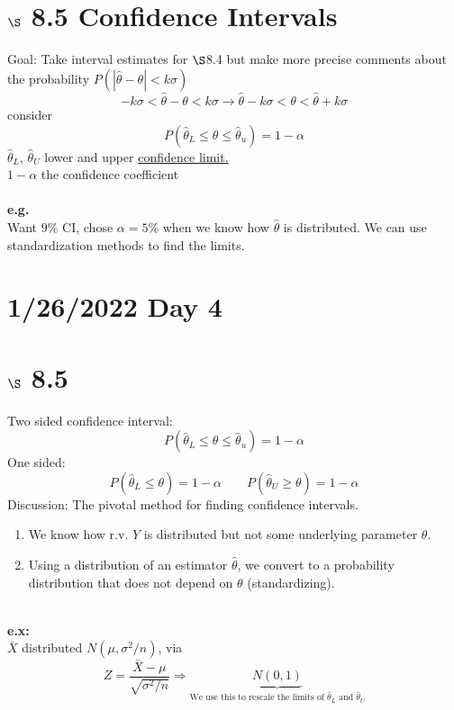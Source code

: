 \documentclass[12pt]{article}
\newcommand{\pars}[1]{\left( {#1} \right) }
\newcommand{\xbar}{\bar{X}}
\begin{document}
\section*{$\S$ 8.5 Confidence Intervals}
Goal: Take interval estimates for $\S$8.4 but make more precise comments about the probability $P\pars{\left| \hat{\theta} - \theta \right| < k\sigma}$
$$-k\sigma < \hat{\theta}-\theta < k\sigma \longrightarrow \hat{\theta} - k \sigma < \theta < \hat{\theta} + k\sigma$$
consider
$$P\pars{\hat{\theta}_L \leq \theta \leq \hat{\theta}_u} = 1 - \alpha$$
$\hat{\theta}_L$, $\hat{\theta}_U$ lower and upper \underline{confidence limit.}
\\$1-\alpha$ the confidence coefficient\\\\
\textbf{e.g.}\\

Want $9\%$ CI, chose $\alpha = 5\%$ when we know how $\hat{\theta}$ is distributed. We can use standardization methods to find the limits.
\newpage
\section*{1/26/2022 Day 4}
\section*{$\S$ 8.5}
Two sided confidence interval:
$$P\pars{\hat{\theta}_L \leq \theta \leq \hat{\theta}_u} = 1 - \alpha$$
One sided:
$$P\pars{\hat{\theta}_L \leq \theta} = 1 - \alpha \qquad P\pars{\hat{\theta}_U \geq \theta} = 1 - \alpha$$
Discussion: The pivotal method for finding confidence intervals.
\begin{enumerate}
    \item We know how r.v. $Y$ is distributed but not some underlying parameter $\theta$.
    \item Using a distribution of an estimator $\hat{\theta}$, we convert to a probability distribution that does not depend on $\theta$ (standardizing).
\end{enumerate}
\vspace{0.10in}\\
\textbf{e.x:}\\

$\xbar$ distributed $N(\mu, \sigma^2/n)$, via
$$Z = \frac{\xbar - \mu}{\sqrt{\sigma^2/n}} \Rightarrow \underbrace{N(0,1)}_{\text{We use this to rescale the limits of } \hat{\theta}_L \text{ and } \hat{\theta}_U}$$
\vspace{0.15in}
\end{document}

